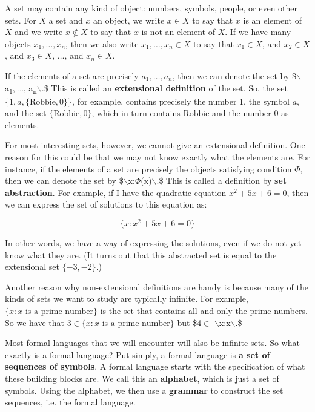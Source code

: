 \documentclass[11pt]{article}
\begin{document}
A set may contain any kind of object: numbers, symbols, people, or even other sets. For \(X\) a set and \(x\) an object, we write \(x\in X\) to say that \(x\) is an element of \(X\) and we write \(x \notin X\) to say that \(x\) is \uline{not} an element of \(X\). If we have many objects \(x_1, \ldots, x_n\), then we also write \(x_1, \ldots, x_n\in X\) to say that \(x_1\in X\), and \(x_2\in X\), and \(x_3\in X\), \(\ldots\), and \(x_n\in X\).

If the elements of a set are precisely \(a_1, \ldots, a_n\), then we can
denote the set by \$$\backslash${a\textsubscript{1}, \ldots, a\textsubscript{n}$\backslash$}.\$ This is called an
\textbf{\textbf{extensional definition}} of the set. So, the set \(\{1,a,
\{\text{Robbie},0\}\}\), for example, contains precisely the number 1, the
symbol \(a\), and the set \(\{\text{Robbie},0\}\), which in turn contains Robbie and the number 0 as elements.

For most interesting sets, however, we cannot give an extensional definition. One reason for this could be that we may not know exactly what the elements are. For instance, if the elements of a set are precisely the objects satisfying condition \(\Phi\), then we can denote the set by \$$\backslash${x:\(\Phi\)(x)$\backslash$}.\$ This is called a definition by \textbf{\textbf{set abstraction}}. For example, if I have the quadratic equation \(x^2+5x+6=0\), then we can express the set of solutions to this equation as:

$$\{x: x^2+5x+6=0\}$$

In other words, we have a way of expressing the solutions, even if we do not yet know what they are. (It turns out that this abstracted set is equal to the extensional set \(\{-3,-2\}\).)

Another reason why non-extensional definitions are handy is because many of the kinds of sets we want to study are typically infinite. 
 For example, \(\{x:x\text{ is a prime number}\}\) is the set that contains all and only the prime numbers. So we have that \(3\in \{x:x\text{ is a prime number}\}\) but \$4\textlnot{}\(\in\) $\backslash${x:x$\backslash$}.\$

Most formal languages that we will encounter will also be infinite sets. So what exactly \uline{is} a formal language? Put simply, a formal language is \textbf{\textbf{a set of sequences of symbols}}. A formal language starts with the specification of what these building blocks are. We call this an \textbf{\textbf{alphabet}}, which is just a set of symbols. Using the alphabet, we then use a \textbf{\textbf{grammar}} to construct the set sequences, i.e. the formal language.
\end{document}
